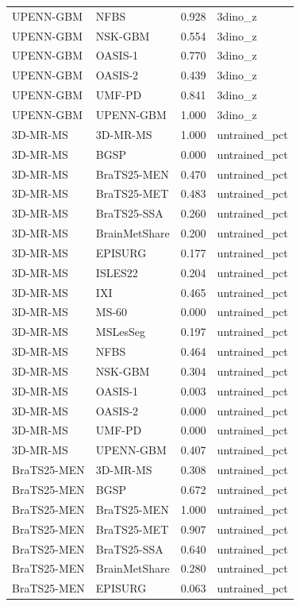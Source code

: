 \begin{tabular}{llrl}
UPENN-GBM & NFBS & 0.928 & 3dino\_z \\
UPENN-GBM & NSK-GBM & 0.554 & 3dino\_z \\
UPENN-GBM & OASIS-1 & 0.770 & 3dino\_z \\
UPENN-GBM & OASIS-2 & 0.439 & 3dino\_z \\
UPENN-GBM & UMF-PD & 0.841 & 3dino\_z \\
UPENN-GBM & UPENN-GBM & 1.000 & 3dino\_z \\
3D-MR-MS & 3D-MR-MS & 1.000 & untrained\_pct \\
3D-MR-MS & BGSP & 0.000 & untrained\_pct \\
3D-MR-MS & BraTS25-MEN & 0.470 & untrained\_pct \\
3D-MR-MS & BraTS25-MET & 0.483 & untrained\_pct \\
3D-MR-MS & BraTS25-SSA & 0.260 & untrained\_pct \\
3D-MR-MS & BrainMetShare & 0.200 & untrained\_pct \\
3D-MR-MS & EPISURG & 0.177 & untrained\_pct \\
3D-MR-MS & ISLES22 & 0.204 & untrained\_pct \\
3D-MR-MS & IXI & 0.465 & untrained\_pct \\
3D-MR-MS & MS-60 & 0.000 & untrained\_pct \\
3D-MR-MS & MSLesSeg & 0.197 & untrained\_pct \\
3D-MR-MS & NFBS & 0.464 & untrained\_pct \\
3D-MR-MS & NSK-GBM & 0.304 & untrained\_pct \\
3D-MR-MS & OASIS-1 & 0.003 & untrained\_pct \\
3D-MR-MS & OASIS-2 & 0.000 & untrained\_pct \\
3D-MR-MS & UMF-PD & 0.000 & untrained\_pct \\
3D-MR-MS & UPENN-GBM & 0.407 & untrained\_pct \\
BraTS25-MEN & 3D-MR-MS & 0.308 & untrained\_pct \\
BraTS25-MEN & BGSP & 0.672 & untrained\_pct \\
BraTS25-MEN & BraTS25-MEN & 1.000 & untrained\_pct \\
BraTS25-MEN & BraTS25-MET & 0.907 & untrained\_pct \\
BraTS25-MEN & BraTS25-SSA & 0.640 & untrained\_pct \\
BraTS25-MEN & BrainMetShare & 0.280 & untrained\_pct \\
BraTS25-MEN & EPISURG & 0.063 & untrained\_pct \\

\end{tabular}
